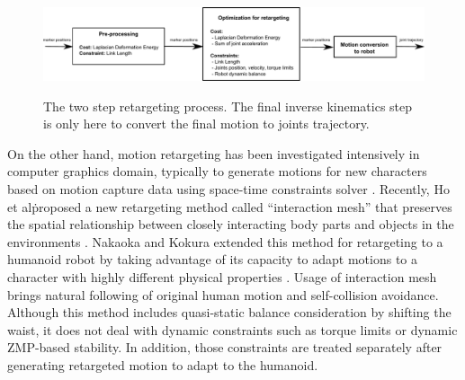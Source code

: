 \documentclass[letterpaper, 10 pt, conference]{ieeeconf}  %
\begin{document}
%

\begin{figure}[b]
  \includegraphics[width=\linewidth]{figure/architecture.pdf}
  \label{fig:algorithm}
  \caption{The two step retargeting process. The final inverse
    kinematics step is only here to convert the final motion to joints
    trajectory.}
\end{figure}


On the other hand, motion retargeting has been investigated
intensively in computer graphics domain, typically to generate motions
for new characters based on motion capture data using space-time
constraints solver \cite{Gleicher98}.  Recently, Ho et al\. proposed a
new retargeting method called ``interaction mesh'' that preserves the
spatial relationship between closely interacting body parts and
objects in the environments \cite{Komura10}.  Nakaoka and Kokura
extended this method for retargeting to a humanoid robot by taking
advantage of its capacity to adapt motions to a character with highly
different physical properties \cite{Nakaoka12Humanoids}. Usage of
interaction mesh brings natural following of original human motion and
self-collision avoidance.  Although this method includes quasi-static
balance consideration by shifting the waist, it does not deal with
dynamic constraints such as torque limits or dynamic ZMP-based
stability. In addition, those constraints are treated separately after
generating retargeted motion to adapt to the humanoid.
\end{document}
